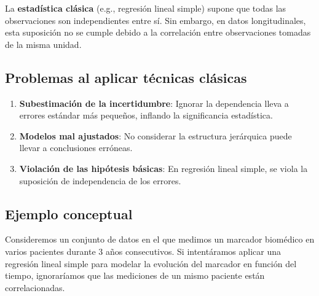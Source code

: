 \documentclass[
  letterpaper,
  DIV=11,
  numbers=noendperiod]{scrreprt}
\providecommand{\tightlist}{%
  \setlength{\itemsep}{0pt}\setlength{\parskip}{0pt}}\usepackage{longtable,booktabs,array}
\begin{document}
La \textbf{estadística clásica} (e.g., regresión lineal simple) supone
que todas las observaciones son independientes entre sí. Sin embargo, en
datos longitudinales, esta suposición no se cumple debido a la
correlación entre observaciones tomadas de la misma unidad.

\subsection{Problemas al aplicar técnicas
clásicas}\label{problemas-al-aplicar-tuxe9cnicas-cluxe1sicas}

\begin{enumerate}
\def\labelenumi{\arabic{enumi}.}
\tightlist
\item
  \textbf{Subestimación de la incertidumbre}: Ignorar la dependencia
  lleva a errores estándar más pequeños, inflando la significancia
  estadística.
\item
  \textbf{Modelos mal ajustados}: No considerar la estructura jerárquica
  puede llevar a conclusiones erróneas.
\item
  \textbf{Violación de las hipótesis básicas}: En regresión lineal
  simple, se viola la suposición de independencia de los errores.
\end{enumerate}

\subsection{Ejemplo conceptual}\label{ejemplo-conceptual}

Consideremos un conjunto de datos en el que medimos un marcador
biomédico en varios pacientes durante 3 años consecutivos. Si
intentáramos aplicar una regresión lineal simple para modelar la
evolución del marcador en función del tiempo, ignoraríamos que las
mediciones de un mismo paciente están correlacionadas.
\end{document}
